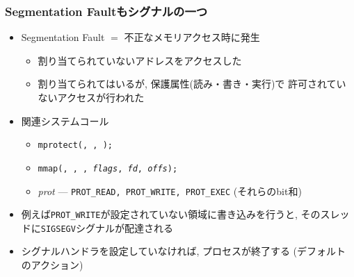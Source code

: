 \documentclass[12pt,dvipdfmx]{beamer}
\begin{document}
\begin{frame}
  \frametitle{Segmentation Faultもシグナルの一つ}
  \begin{itemize}
  \item Segmentation Fault $=$ 不正なメモリアクセス時に発生 
    \begin{itemize}
    \item 割り当てられていないアドレスをアクセスした
    \item 割り当てられてはいるが, 保護属性(読み・書き・実行)で
      許可されていないアクセスが行われた
    \end{itemize}
  \item 関連システムコール
    \begin{itemize}
    \item {\tt mprotect(, , );}
    \item {\tt mmap(, , , {\it flags}, {\it fd}, {\it offs});}
    \item {\it prot} --- {\tt PROT\_READ, PROT\_WRITE, PROT\_EXEC} (それらのbit和)
    \end{itemize}
  \item 例えば{\tt PROT\_WRITE}が設定されていない領域に書き込みを行うと,
    そのスレッドに{\tt SIGSEGV}シグナルが配達される
    
  \item シグナルハンドラを設定していなければ, プロセスが終了する
    (デフォルトのアクション)
  \end{itemize}
\end{frame}
\end{document}
